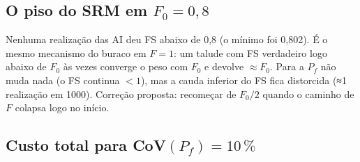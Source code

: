 \documentclass[11pt,a4paper]{article}
\begin{document}
\subsection{O piso do SRM em $F_0 = 0{,}8$}
Nenhuma realização das AI deu FS abaixo de 0,8 (o mínimo foi 0,802). É o mesmo mecanismo do buraco em $F = 1$: um talude
com FS verdadeiro logo abaixo de $F_0$ às vezes converge o peso com $F_0$ e devolve $\approx F_0$. Para a $P_f$ não muda
nada (o FS continua $< 1$), mas a cauda inferior do FS fica distorcida (≈1 realização em 1000). Correção proposta:
recomeçar de $F_0/2$ quando o caminho de $F$ colapsa logo no início.

\subsection{Custo total para CoV$(P_f) = 10\,\%$}
\begin{table}[H]\centering\small
{}
\caption{Análises de elementos finitos, com o piloto (1000) e o FORM incluídos. Com o piloto na malha grossa (custo
1/20, Seção~\ref{sec:hip}), a AI pela banda cai para ≈1300 e ≈2700.}
\end{table}
\end{document}
